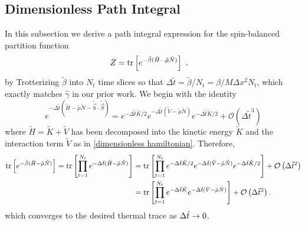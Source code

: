 \subsection{Dimensionless Path Integral}

In this subsection we derive a path integral expression for the spin-balanced partition function
\begin{align}
	Z
	&=
	\text{tr}\left[e^{-\tilde{\beta}(\tilde{H}-\tilde{\mu}\tilde{N})}\right]~.
\end{align}
by Trotterizing  $\tilde{\beta}$ into $N_t$ time slices so that $\Delta \tilde{t} = \tilde{\beta}/N_t = \beta/M \Delta x^2 N_t$, which exactly matches $\hat{\gamma}$ in our prior work.
We begin with the identity
\begin{equation}
	e^{-\Delta \tilde{t}(\tilde{H} - \tilde{\mu}\tilde{N} - \tilde{\vec{h}}\cdot\tilde{\vec{S}})}
	=
	e^{-\Delta \tilde{t}\tilde{K} / 2}
	e^{-\Delta \tilde{t} (\tilde{V} - \tilde{\mu} \tilde{N})}
	e^{-\Delta \tilde{t}\tilde{K} / 2}
	+
	\mathcal{O}(\Delta \tilde{t}^3) 
\end{equation}
where $\tilde{H} = \tilde{K} + \tilde{V}$ has been decomposed into the kinetic energy $\tilde{K}$ and the interaction term $\tilde{V}$ as in \eqref{dimensionless hamiltonian}.
Therefore,
\begin{align}
	\text{tr}\left[e^{-\tilde{\beta}(\tilde{H}-\tilde{\mu} \tilde{N})}\right]
	=
	\text{tr}\left[
		\prod_{t=1}^{N_t}
		e^{-\Delta \tilde{t} (\tilde{H}-\tilde{\mu}\tilde{N})}
	\right]
	&=
	\text{tr}\left[
		\prod_{t=1}^{N_t}
		e^{-\Delta \tilde{t}\tilde{K} / 2}
		e^{-\Delta \tilde{t} (\tilde{V} - \tilde{\mu} \tilde{N})}
		e^{-\Delta \tilde{t}\tilde{K} / 2}
	\right]
	+ \mathcal{O}\left(\Delta \tilde{t}^2\right)
	\nonumber\\
	&=
	\text{tr}\left[
		\prod_{t=1}^{N_t}
		e^{-\Delta \tilde{t}\tilde{K}}
		e^{-\Delta \tilde{t} (\tilde{V} - \tilde{\mu} \tilde{N})}
	\right]
	+ \mathcal{O}\left(\Delta \tilde{t}^2\right).
	\label{eq:trotterization}
\end{align}
which converges to the desired thermal trace as $\Delta \tilde{t} \rightarrow 0$.

